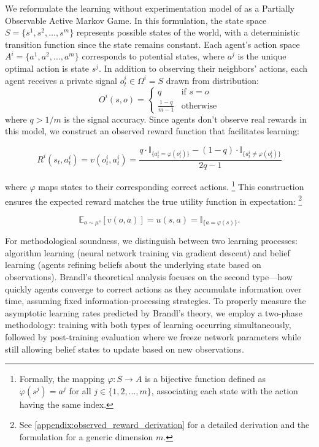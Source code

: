 \documentclass[a4paper,12pt]{report}
\begin{document}
We reformulate the learning without experimentation model of \citet{brandl2024} as a Partially Observable Active Markov Game. In this formulation, the state space $S = \{s^1, s^2, \ldots, s^m\}$ represents possible states of the world, with a deterministic transition function since the state remains constant. Each agent's action space $A^i = \{a^1, a^2, \ldots, a^m\}$ corresponds to potential states, where $a^j$ is the unique optimal action is state $s^j$. In addition to observing their neighbors' actions, each agent receives a private signal $o^i_t \in \Omega^i = S$ drawn from distribution:
\begin{equation*}
    O^i(s,o) =
    \begin{cases}
        q               & \text{if } s = o \\
        \frac{1-q}{m-1} & \text{otherwise}
    \end{cases}
\end{equation*}
where $q > 1/m$ is the signal accuracy. Since agents don't observe real rewards in this model, we construct an observed reward function that facilitates learning:

\begin{equation*}
    R^i(s_t, a^i_t) = v(o^i_t, a^i_t) = \frac{q \cdot \mathbb{I}_{\{a^i_t = \varphi(o^i_t)\}} - (1 - q) \cdot \mathbb{I}_{\{a^i_t \neq \varphi(o^i_t)\}}}{2q - 1}
\end{equation*}

where $\varphi$ maps states to their corresponding correct actions. \footnote{Formally, the mapping $\varphi: S \rightarrow A$ is a bijective function defined as $\varphi(s^j) = a^j$ for all $j \in \{1,2,...,m\}$, associating each state with the action having the same index.} This construction ensures the expected reward matches the true utility function in expectation: \footnote{See \ref{appendix:observed_reward_derivation} for a detailed derivation and the formulation for a generic dimension $m$.}

\begin{equation*}
    \mathbb{E}_{o \sim \mu^{s}}[v(o, a)] = u(s, a) = \mathbb{I}_{\{a = \varphi(s)\}}.
\end{equation*}

For methodological soundness, we distinguish between two learning processes: algorithm learning (neural network training via gradient descent) and belief learning (agents refining beliefs about the underlying state based on observations). Brandl's theoretical analysis focuses on the second type—how quickly agents converge to correct actions as they accumulate information over time, assuming fixed information-processing strategies. To properly measure the asymptotic learning rates predicted by Brandl's theory, we employ a two-phase methodology: training with both types of learning occurring simultaneously, followed by post-training evaluation where we freeze network parameters while still allowing belief states to update based on new observations.
\end{document}
